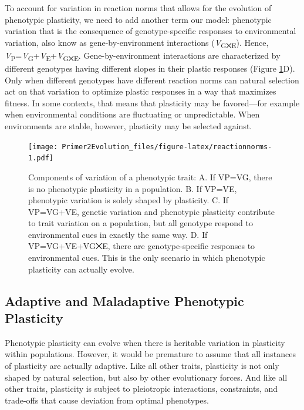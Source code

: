 \documentclass[
]{book}
\begin{document}
To account for variation in reaction norms that allows for the evolution of phenotypic plasticity, we need to add another term our model: phenotypic variation that is the consequence of genotype-specific responses to environmental variation, also know as gene-by-environment interactions (\emph{V}\textsubscript{G⨉E}). Hence, \emph{V}\textsubscript{P}=\emph{V}\textsubscript{G}+\emph{V}\textsubscript{E}+\emph{V}\textsubscript{G⨉E}. Gene-by-environment interactions are characterized by different genotypes having different slopes in their plastic responses (Figure \ref{fig:reactionnorms}D). Only when different genotypes have different reaction norms can natural selection act on that variation to optimize plastic responses in a way that maximizes fitness. In some contexts, that means that plasticity may be favored---for example when environmental conditions are fluctuating or unpredictable. When environments are stable, however, plasticity may be selected against.

\begin{figure}
\centering
\texttt{[image: Primer2Evolution\_files/figure-latex/reactionnorms-1.pdf]}
\caption{\label{fig:reactionnorms}Components of variation of a phenotypic trait: A. If VP=VG, there is no phenotypic plasticity in a population. B. If VP=VE, phenotypic variation is solely shaped by plasticity. C. If VP=VG+VE, genetic variation and phenotypic plasticity contribute to trait variation on a population, but all genotype respond to environmental cues in exactly the same way. D. If VP=VG+VE+VG⨉E, there are genotype-specific responses to environmental cues. This is the only scenario in which phenotypic plasticity can actually evolve.}
\end{figure}

\hypertarget{adaptive-and-maladaptive-phenotypic-plasticity}{%
\subsection{Adaptive and Maladaptive Phenotypic Plasticity}\label{adaptive-and-maladaptive-phenotypic-plasticity}}

Phenotypic plasticity can evolve when there is heritable variation in plasticity within populations. However, it would be premature to assume that all instances of plasticity are actually adaptive. Like all other traits, plasticity is not only shaped by natural selection, but also by other evolutionary forces. And like all other traits, plasticity is subject to pleiotropic interactions, constraints, and trade-offs that cause deviation from optimal phenotypes.
\end{document}
